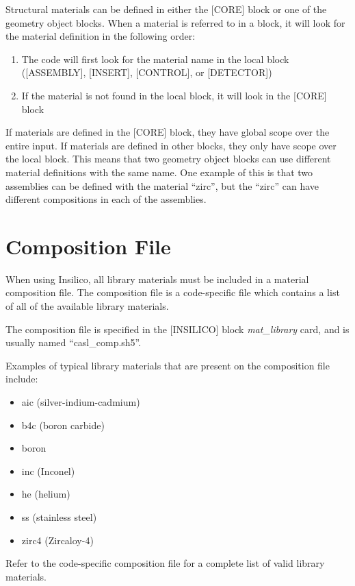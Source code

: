 Structural materials can be defined in either the [CORE] block or one of the
geometry object blocks.  When a material is referred to in a block, it will look
for the material definition in the following order:
\begin{enumerate}  %
 \item The code will first look for the material name in the local block ([ASSEMBLY], [INSERT], [CONTROL], or [DETECTOR])
 \item If the material is not found in the local block, it will look in the [CORE] block
\end{enumerate}

If materials are defined in the [CORE] block, they have global scope over the entire input.
If materials are defined in other blocks, they only have scope over the local block.  This means
that two geometry object blocks can use different material definitions with the same name.
One example of this is that two assemblies can be defined with the material ``zirc'', but
the ``zirc'' can have different compositions in each of the assemblies.

\section{Composition File}

When using Insilico, all library materials must be included in a material composition file.
The composition file is a code-specific file which contains a list of all
of the available library materials.

The composition file is specified in the [INSILICO] block {\it mat\_library} card,
and is usually named ``casl\_comp.sh5''.

Examples of typical library materials that are present on the composition file include:
\begin{itemize}   %
  \item aic (silver-indium-cadmium)
  \item b4c (boron carbide)
  \item boron
  \item inc (Inconel)
  \item he  (helium)
  \item ss  (stainless steel)
  \item zirc4 (Zircaloy-4)
\end{itemize}
Refer to the code-specific composition file for a complete list of valid library materials.

